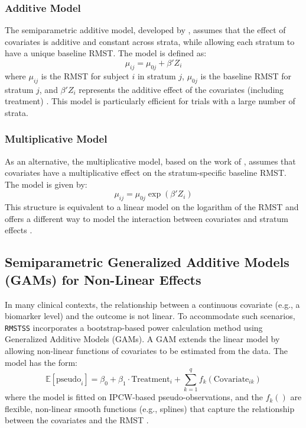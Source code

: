 \documentclass[article]{jss}
\begin{document}
\subsubsection{Additive Model}
The semiparametric additive model, developed by \citet{zhang2024}, assumes that the effect of covariates is additive and constant across strata, while allowing each stratum to have a unique baseline RMST. The model is defined as:
\begin{equation}
\mu_{ij} = \mu_{0j} + \beta'Z_i
\end{equation}
where $\mu_{ij}$ is the RMST for subject $i$ in stratum $j$, $\mu_{0j}$ is the baseline RMST for stratum $j$, and $\beta'Z_i$ represents the additive effect of the covariates (including treatment) \cite{[1]}. This model is particularly efficient for trials with a large number of strata.

\subsubsection{Multiplicative Model}
As an alternative, the multiplicative model, based on the work of \citet{wang2019}, assumes that covariates have a multiplicative effect on the stratum-specific baseline RMST. The model is given by:
\begin{equation}
\mu_{ij} = \mu_{0j} \exp(\beta'Z_i)
\end{equation}
This structure is equivalent to a linear model on the logarithm of the RMST and offers a different way to model the interaction between covariates and stratum effects \cite{[1]}.

\subsection{Semiparametric Generalized Additive Models (GAMs) for Non-Linear Effects}
In many clinical contexts, the relationship between a continuous covariate (e.g., a biomarker level) and the outcome is not linear. To accommodate such scenarios, \texttt{RMSTSS} incorporates a bootstrap-based power calculation method using Generalized Additive Models (GAMs). A GAM extends the linear model by allowing non-linear functions of covariates to be estimated from the data. The model has the form:
\begin{equation}
\mathbb{E}[\text{pseudo}_i] = \beta_0 + \beta_1 \cdot \text{Treatment}_i + \sum_{k=1}^{q} f_k(\text{Covariate}_{ik})
\end{equation}
where the model is fitted on IPCW-based pseudo-observations, and the $f_k()$ are flexible, non-linear smooth functions (e.g., splines) that capture the relationship between the covariates and the RMST \cite{[1]}.
\end{document}
